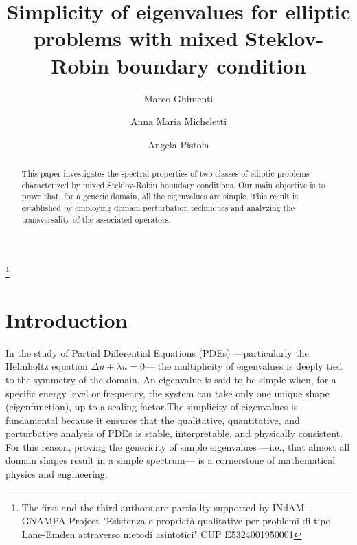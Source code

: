 \documentclass[a4paper,reqno,11pt,oneside]{amsart}
\theoremstyle{plain}
\theoremstyle{plain}
\theoremstyle{plain}
\theoremstyle{remark}
\begin{document}
\title[Simplicity of eigenvalues]{Simplicity of eigenvalues for elliptic problems with mixed  Steklov-Robin boundary condition}
  

\author{Marco Ghimenti}
\address[Marco Ghimenti]{Dipartimento di Matematica
Universit\`a di Pisa
Largo Bruno Pontecorvo 5, I - 56127 Pisa, Italy}

\author{Anna Maria Micheletti}
\address[Anna Maria Micheletti]{Dipartimento di Matematica
Universit\`a di Pisa
Largo Bruno Pontecorvo 5, I - 56127 Pisa, Italy}

\author{Angela Pistoia}
\address[Angela Pistoia] {Dipartimento SBAI, Universit\`{a} di Roma ``La Sapienza", via Antonio Scarpa 16, 00161 Roma, Italy}
 

 
\thanks{The first and the third authors are partiallty supported by INdAM - GNAMPA Project "Esistenza e propriet\`a qualitative per problemi di tipo Lane-Emden attraverso metodi asintotici" CUP E5324001950001}

 

\begin{abstract}  
    This paper investigates the spectral properties of two classes of elliptic problems characterized by mixed Steklov-Robin boundary conditions.  Our main objective is to prove that, for a generic domain, all the eigenvalues are simple. This result is established by employing domain perturbation techniques and analyzing the transversality of the associated operators.
\end{abstract}


 \maketitle
 



\section{Introduction}

In the study of Partial Differential Equations (PDEs) —particularly the Helmholtz equation $\Delta u + \lambda u = 0$— the multiplicity of eigenvalues is deeply tied to the symmetry of the domain. An eigenvalue is said to be simple when, for a specific energy level or frequency, the system can take only one unique shape (eigenfunction), up to a scaling factor.The simplicity of eigenvalues is fundamental because it ensures that the qualitative, quantitative, and perturbative analysis of PDEs is stable, interpretable, and physically consistent. For this reason, proving the genericity of simple eigenvalues —i.e., that almost all domain shapes result in a simple spectrum— is a cornerstone of mathematical physics and engineering.\\
\end{document}
